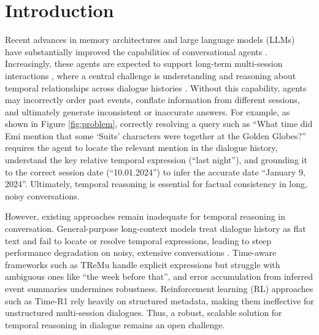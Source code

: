 \documentclass{article} %
\begin{document}

\section{Introduction}
Recent advances in memory architectures and large language models (LLMs) have substantially improved the capabilities of conversational agents \citep{yu2025memagent, zhong2024memorybank, xu2025mem}. Increasingly, these agents are expected to support long-term multi-session interactions \citep{du2025bridging, ge2025tremu}, where a central challenge is understanding and reasoning about temporal relationships across dialogue histories \citep{wu2025longmemeval, maharana-etal-2024-evaluating}. Without this capability, agents may incorrectly order past events, conflate information from different sessions, and ultimately generate inconsistent or inaccurate answers. For example, as shown in Figure \ref{fig:problem}, correctly resolving a query such as ``What time did Emi mention that some `Suits' characters were together at the Golden Globes?'' requires the agent to locate the relevant mention in the dialogue history, understand the key relative temporal expression (``last night''), and grounding it to the correct session date (``10.01.2024'') to infer the accurate date ``January 9, 2024''. Ultimately, temporal reasoning is essential for factual consistency in long, noisy conversations.

However, existing approaches \citep{yu2025memagent, xu2025mem} remain inadequate for temporal reasoning in conversation. General-purpose long-context models \citep{qwen2.5, guo2025deepseek,wang2025mmlongbench} treat dialogue history as flat text and fail to locate or resolve temporal expressions, leading to steep performance degradation on noisy, extensive conversations \citep{wu2025longmemeval, maharana-etal-2024-evaluating}. Time-aware frameworks such as TReMu \citep{ge2025tremu} handle explicit expressions but struggle with ambiguous ones like “the week before that”, and error accumulation from inferred event summaries undermines robustness. Reinforcement learning (RL) approaches such as Time-R1 \citep{liu2025time} rely heavily on structured metadata, making them ineffective for unstructured multi-session dialogues. Thus, a robust, scalable solution for temporal reasoning in dialogue remains an open challenge.
\end{document}
